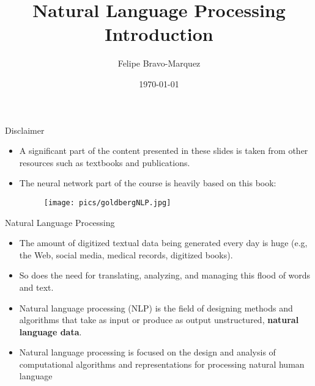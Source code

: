 \documentclass[handout]{beamer}
\title{Natural Language Processing \\ Introduction}
\author[Felipe Bravo Márquez]{\footnotesize
 \textcolor[rgb]{0.00,0.00,1.00}{Felipe Bravo-Marquez}}
\date{\today}
\begin{document}
\begin{frame}
\titlepage


\end{frame}


\begin{frame}{Disclaimer}
\begin{scriptsize}
\begin{itemize}
 \item  A significant part of the content presented in these slides is taken from other resources such as textbooks and publications.  
 \item  The neural network part of the course is heavily based on this book:
   \begin{figure}[h]
        	\texttt{[image: pics/goldbergNLP.jpg]}
        \end{figure}
\end{itemize}
\end{scriptsize}

 
\end{frame}


\begin{frame}{Natural Language Processing}
\begin{scriptsize}
\begin{itemize}

\item The amount of digitized textual data being generated every day is huge (e.g, the Web, social media, medical records, digitized books).

\item So does the need for translating, analyzing, and managing this flood of words and text.

\item Natural language processing (NLP) is the field of designing methods and algorithms that take as input or produce as output unstructured, \textbf{natural language data}. \cite{goldberg2017neural}

\item Natural language processing is focused on the design and analysis of computational algorithms and representations for processing natural human language \cite{jacobbook}

\end{itemize}
\end{scriptsize}
\end{frame}
\end{document}
